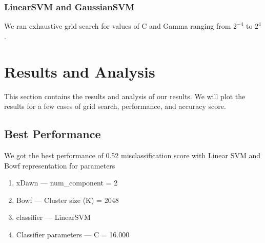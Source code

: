 \documentclass[final,leqno,onefignum,onetabnum]{siamltexmm}
\begin{document}
\subsubsection{LinearSVM and GaussianSVM}
We ran exhaustive grid search for values of C and Gamma ranging from $2^{-4}$ to $2^{4}$.

\section{Results and Analysis}
This section contains the results and analysis of our results.  We will plot the results for a few cases of grid search, performance, and accuracy score.
\subsection{Best Performance}
We got the best performance of 0.52 misclassification score with Linear SVM and Bowf representation for parameters
\begin{enumerate}
  \item  xDawn --- num\_component = 2
  \item  Bowf --- Cluster size (K) = 2048
  \item  classifier --- LinearSVM
  \item  Classifier parameters --- C = 16.000
\end{enumerate}
\end{document}
